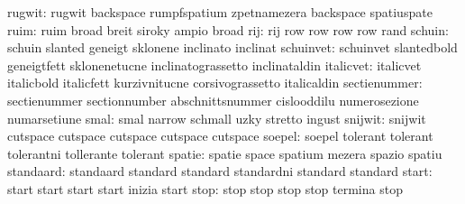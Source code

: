                    rugwit: rugwit                    backspace
                           rumpfspatium              zpetnamezera
                           backspace                 spatiuspate %
                     ruim: ruim                      broad
                           breit                     siroky
                           ampio                     broad
                      rij: rij                       row
                           row                       row
                           row                       rand
                   schuin: schuin                    slanted
                           geneigt                   sklonene
                           inclinato                 inclinat
                schuinvet: schuinvet                 slantedbold
                           geneigtfett               sklonenetucne
                           inclinatograssetto        inclinataldin
                italicvet: italicvet                 italicbold
                           italicfett                kurzivnitucne
                           corsivograssetto          italicaldin
             sectienummer: sectienummer              sectionnumber
                           abschnittsnummer          cislooddilu
                           numerosezione             numarsetiune
                     smal: smal                      narrow
                           schmall                   uzky
                           stretto                   ingust
                  snijwit: snijwit                   cutspace
                           cutspace                  cutspace
                           cutspace                  cutspace %
                   soepel: soepel                    tolerant
                           tolerant                  tolerantni
                           tollerante                tolerant
                   spatie: spatie                    space
                           spatium                   mezera
                           spazio                    spatiu %
                standaard: standaard                 standard
                           standard                  standardni
                           standard                  standard
                    start: start                     start
                           start                     start
                           inizia                    start
                     stop: stop                      stop
                           stop                      stop
                           termina                   stop
